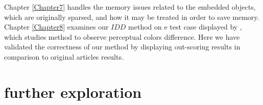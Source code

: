 Chapter \ref{Chapter7} handles the memory issues related to the embedded objects, which are originally sparsed, and how it may be treated in order to save memory.\\

Chapter \ref{Chapter8} examines our $IDD$ method on e test case displayed by \cite{perp_color}, which studies method to observe perceptual colors difference. Here we have validated the correctness of our method by displaying out-scoring results in comparison to original articles results.

\break
\section{further exploration}
